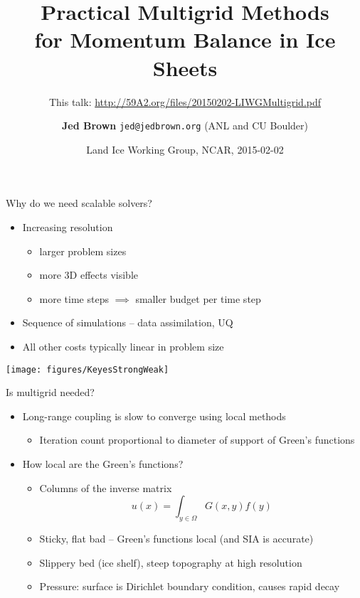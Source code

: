 \documentclass{beamer}
\title{Practical Multigrid Methods \\ for Momentum Balance in Ice Sheets}
\subtitle{This talk: \url{http://59A2.org/files/20150202-LIWGMultigrid.pdf}}
\author{{\bf Jed Brown} \texttt{jed@jedbrown.org} (ANL and CU Boulder)}
\date{Land Ice Working Group, NCAR, 2015-02-02}
\begin{document}
\lstset{language=C}
\normalem

\begin{frame}
  \titlepage
\end{frame}

\begin{frame}{Why do we need scalable solvers?}
  \begin{itemize}
  \item Increasing resolution
    \begin{itemize}
    \item larger problem sizes
    \item more 3D effects visible
    \item more time steps $\implies$ smaller budget per time step
    \end{itemize}
  \item Sequence of simulations -- data assimilation, UQ
  \item All other costs typically linear in problem size
  \end{itemize}
\end{frame}

\begin{frame}
  \texttt{[image: figures/KeyesStrongWeak]} \\
\end{frame}

\begin{frame}{Is multigrid needed?}
  \begin{itemize}
  \item Long-range coupling is slow to converge using local methods
    \begin{itemize}
    \item Iteration count proportional to diameter of support of Green's functions
    \end{itemize}
  \item How local are the Green's functions?
    \begin{itemize}
    \item Columns of the inverse matrix
      \begin{equation*}
        u(x) = \int_{y \in \Omega} G(x,y) f(y)
      \end{equation*}
    \item Sticky, flat bad -- Green's functions local (and SIA is accurate)
    \item Slippery bed (ice shelf), steep topography at high resolution
    \item Pressure: surface is Dirichlet boundary condition, causes rapid decay
    \end{itemize}
  \end{itemize}
\end{frame}
\end{document}
